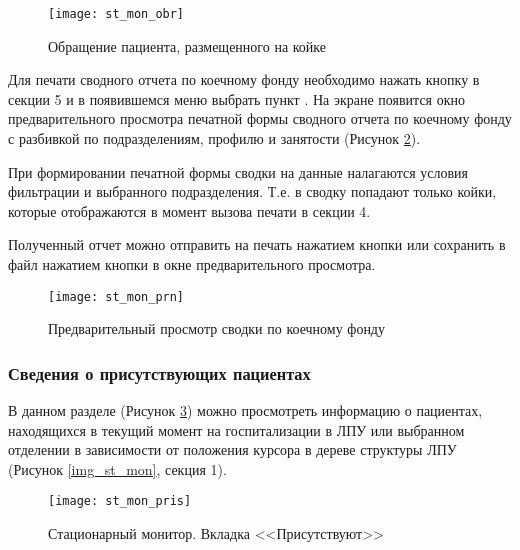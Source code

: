 \begin{figure}[ht]\centering
   \texttt{[image: st\_mon\_obr]}
   \caption{Обращение пациента, размещенного на койке}
   \label{img_st_mon_obr}
\end{figure}

Для печати сводного отчета по коечному фонду необходимо нажать кнопку  в секции 5 и в появившемся меню выбрать пункт . На экране появится окно предварительного просмотра печатной формы сводного отчета по коечному фонду с разбивкой по подразделениям, профилю и занятости (Рисунок \ref{img_st_mon_prn}).

\begin{vnim}
 При формировании печатной формы сводки на данные налагаются условия фильтрации и выбранного подразделения. Т.е. в сводку попадают только койки, которые отображаются в момент вызова печати в секции 4.
\end{vnim}

Полученный отчет можно отправить на печать нажатием кнопки   или сохранить в файл нажатием кнопки  в окне предварительного просмотра.

\begin{figure}[ht]\centering
   \texttt{[image: st\_mon\_prn]}
   \caption{Предварительный просмотр сводки по коечному фонду}
   \label{img_st_mon_prn}
\end{figure}

\subsubsection{Сведения о присутствующих пациентах}

В данном разделе (Рисунок \ref{img_st_mon_pris}) можно просмотреть информацию о пациентах, находящихся в текущий момент на госпитализации в ЛПУ или выбранном отделении в зависимости от положения курсора в дереве структуры ЛПУ (Рисунок \ref{img_st_mon}, секция 1).

\begin{figure}[ht]\centering
   \texttt{[image: st\_mon\_pris]}
   \caption{Стационарный монитор. Вкладка <<Присутствуют>>}
   \label{img_st_mon_pris}
\end{figure}

